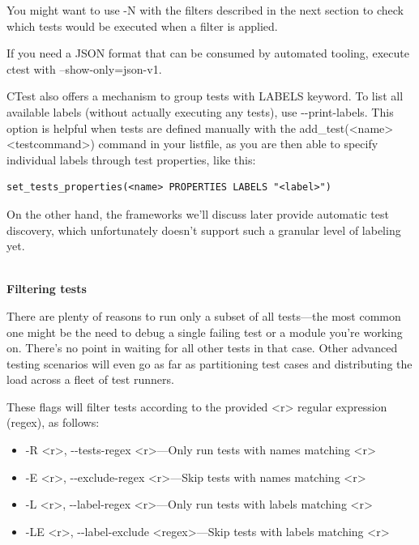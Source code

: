You might want to use -N with the filters described in the next section to check which tests would be executed when a filter is applied.

If you need a JSON format that can be consumed by automated tooling, execute ctest with --show-only=json-v1.

CTest also offers a mechanism to group tests with LABELS keyword. To list all available labels (without actually executing any tests), use -{}-print-labels. This option is helpful when tests are defined manually with the add\_test(<name> <testcommand>) command in your listfile, as you are then able to specify individual labels through test properties, like this:

\begin{lstlisting}[style=styleCMake]
set_tests_properties(<name> PROPERTIES LABELS "<label>")
\end{lstlisting} 

On the other hand, the frameworks we'll discuss later provide automatic test discovery, which unfortunately doesn't support such a granular level of labeling yet.

\hspace*{\fill} \\ %
\noindent
\textbf{Filtering tests}

There are plenty of reasons to run only a subset of all tests—the most common one might be the need to debug a single failing test or a module you're working on. There's no point in waiting for all other tests in that case. Other advanced testing scenarios will even go as far as partitioning test cases and distributing the load across a fleet of test runners.

These flags will filter tests according to the provided <r> regular expression (regex), as follows:

\begin{itemize}
\item 
-R <r>, -{}-tests-regex <r>—Only run tests with names matching <r>

\item 
-E <r>, -{}-exclude-regex <r>—Skip tests with names matching <r>

\item 
-L <r>, -{}-label-regex <r>—Only run tests with labels matching <r>

\item 
-LE <r>, -{}-label-exclude <regex>—Skip tests with labels matching <r>
\end{itemize}

